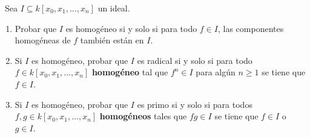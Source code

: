 \documentclass[twoside]{article}
\begin{document}
\newpage
\begin{ejercicio}{1}\
Sea $I \subseteq k[x_0, x_1,\dots, x_n]$ un ideal.
\begin{enumerate}
\item Probar que $I$ es homogéneo si y solo si para todo $f \in I$, las
componentes
homogéneas de $f$ también están en $I$.
\item  Si $I$ es homogéneo, probar que $I$ es radical si y solo si para todo $f \in k[x_0, x_1,\dots, x_n]$
\textbf{homogéneo} tal que $f^n \in I$ para algún $n \geq 1$ se tiene que $f \in I$.
\item Si $I$ es homogéneo, probar que $I$ es primo si y solo si para todos $f, g \in
k[x_0, x_1,\dots, x_n]$ \textbf{homogéneos} tales que $fg \in I$ se tiene que $f \in I$ o $g \in I$.
\end{enumerate}
\end{ejercicio}
\end{document}
